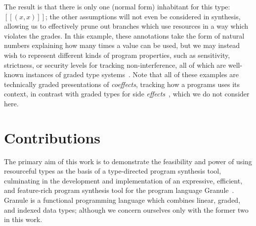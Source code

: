 The result is that there is only one (normal form) inhabitant for this type: $[[
(x, x) ]]$; the other assumptions will not even be considered in synthesis,
allowing us to effectively prune out branches which use resources in a way which
violates the grades. In this example, these annotations take the form of natural
numbers explaining how many times a value can be used, but we may instead wish
to represent different kinds of program properties, such as sensitivity,
strictness, or security levels for tracking non-interference, all of which are
well-known instances of graded type
systems~\citep{DBLP:journals/pacmpl/OrchardLE19,DBLP:conf/icfp/GaboardiKOBU16,DBLP:journals/pacmpl/AbelB20}.
Note that all of these examples are technically graded presentations of
\emph{coeffects}, tracking how a programs uses its context, in contrast with
graded types for side
\emph{effects}~\citep{DBLP:journals/corr/OrchardPM14,DBLP:conf/popl/Katsumata14},
which we do not consider here.


\section{Contributions}
The primary aim of this work is to demonstrate the feasibility and power of
using resourceful types as the basis of a type-directed program synthesis tool,
culminating in the development and implementation of an expressive, efficient,
and feature-rich program synthesis tool for the program language
Granule~\cite{DBLP:journals/pacmpl/OrchardLE19}. Granule is a functional
programming language which combines linear, graded, and indexed data types;
although we concern ourselves only with the former two in this work. 

